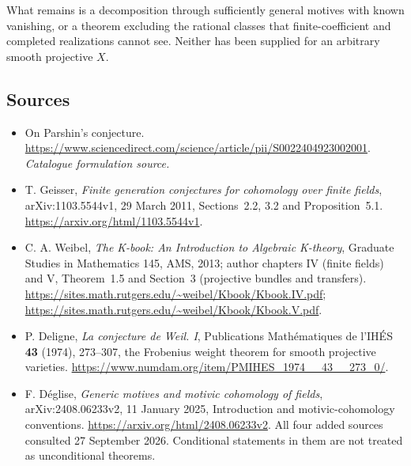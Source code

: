 \documentclass[11pt,a4paper]{article}
\numberwithin{equation}{section}
\begin{document}
What remains is a decomposition through sufficiently general motives
with known vanishing, or a theorem excluding the rational classes that
finite-coefficient and completed realizations cannot see. Neither has
been supplied for an arbitrary smooth projective $X$.
\subsection{Sources}
\begin{itemize}\raggedright
\item[\textnormal{[S1]}]\hypertarget{source:222:1}{} On Parshin's conjecture.
\url{https://www.sciencedirect.com/science/article/pii/S0022404923002001}.
{\small\textit{Catalogue formulation source.}}
\item[\textnormal{[E1]}]\hypertarget{extra:222:1}{}
T. Geisser, \emph{Finite generation conjectures for cohomology over finite
fields}, arXiv:1103.5544v1, 29 March 2011, Sections~2.2, 3.2 and
Proposition~5.1. \url{https://arxiv.org/html/1103.5544v1}.
\item[\textnormal{[E2]}]\hypertarget{extra:222:2}{}
C. A. Weibel, \emph{The K-book: An Introduction to Algebraic K-theory},
Graduate Studies in Mathematics 145, AMS, 2013; author chapters IV
(finite fields) and V, Theorem~1.5 and Section~3 (projective bundles and
transfers). \url{https://sites.math.rutgers.edu/~weibel/Kbook/Kbook.IV.pdf};
\url{https://sites.math.rutgers.edu/~weibel/Kbook/Kbook.V.pdf}.
\item[\textnormal{[E3]}]\hypertarget{extra:222:3}{}
P. Deligne, \emph{La conjecture de Weil. I}, Publications Math\'ematiques
de l'IH\'ES \textbf{43} (1974), 273--307, the Frobenius weight theorem
for smooth projective varieties.
\url{https://www.numdam.org/item/PMIHES_1974__43__273_0/}.
\item[\textnormal{[E4]}]\hypertarget{extra:222:4}{}
F. D\'eglise, \emph{Generic motives and motivic cohomology of fields},
arXiv:2408.06233v2, 11 January 2025, Introduction and motivic-cohomology
conventions. \url{https://arxiv.org/html/2408.06233v2}.
All four added sources consulted 27 September 2026. Conditional statements
in them are not treated as unconditional theorems.
\end{itemize}
\end{document}
